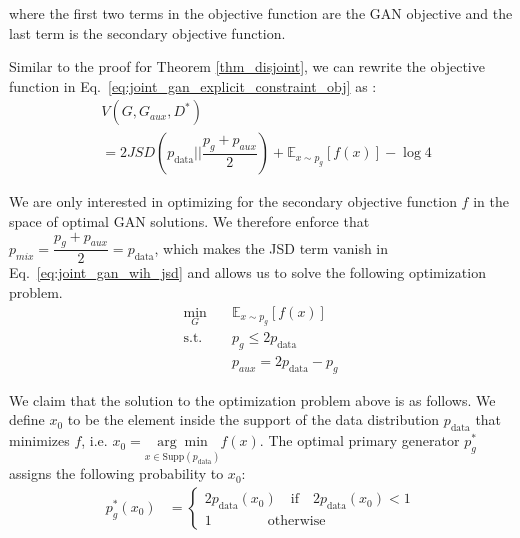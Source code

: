 where the first two terms in the objective function are the GAN objective and the last term is the secondary objective function. 

Similar to the proof for Theorem \ref{thm_disjoint}, we can rewrite the objective function in Eq.~\ref{eq:joint_gan_explicit_constraint_obj} as \cite{gan}:
\begin{align}
     & V(G, G_{aux}, D^*)\\
     & = 2JSD( p_{\text{data}} || \dfrac{ p_g + p_{aux} }{ 2 } ) + \mathbb{E}_{x \sim p_g} [ f ( x ) ] - \log 4 \label{eq:joint_gan_wih_jsd}
\end{align}

We are only interested in optimizing for the secondary objective function $f$ in the space of optimal GAN solutions. We therefore enforce that $p_{mix} = \dfrac{ p_g + p_{aux} }{ 2 } = p_{\text{data}}$, which makes the JSD term vanish in Eq.~\ref{eq:joint_gan_wih_jsd} and allows us to solve the following optimization problem.
\begin{align}
    \min_{G } \quad & \mathbb{E}_{x \sim p_g} [ f ( x ) ] \\ 
\textrm{s.t.} \quad & p_g \leq 2 p_{\text{data}} \label{eq:joint_gan_explicit_constraint_simplified_constraint_1} \\
& p_{aux} = 2 p_{\text{data}} - p_g \label{eq:joint_gan_explicit_constraint_simplified_constraint_2}
\end{align}


We claim that the solution to the optimization problem above is as follows. We define $x_0$ to be the element inside the support of the data distribution $p_{\text{data}}$ that minimizes $f$, i.e. $ x_0 = \underset{x \in \text{Supp}( p_{\text{data}} ) }{\arg\min} f(x) $.
The optimal primary generator $p^*_g$ assigns the following probability to $x_0$:
\begin{align}
    p^*_{g} (x_0) & = \begin{cases}
    2p_{\text{data}} (x_0) \quad  \text{if} \quad 2p_{\text{data}} (x_0) < 1 \\
    1 \quad \quad  \quad \quad \text{otherwise}
    \end{cases}
\end{align}

